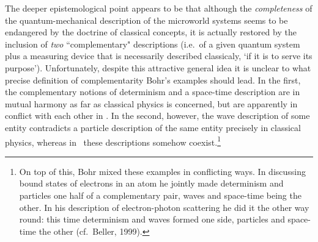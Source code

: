 \documentclass[12pt,titlepage]{article}
\begin{document}
 The deeper epistemological point appears to be that although the {\it completeness} of the quantum-mechanical description of  the microworld systems seems to be endangered by the doctrine of classical concepts, it is actually restored by the inclusion of {\it two} ``complementary" descriptions (i.e.\ of a given quantum system plus a measuring device that is necessarily described classicaly, `if it is to serve its purpose'). Unfortunately, despite this attractive general idea it is unclear to what precise definition of complementarity Bohr's examples should lead. In the first, the complementary notions of determinism and a space-time description are in mutual harmony as far as classical physics is concerned, but are apparently in conflict with each other in \qm. In the second, however, the wave description of some entity contradicts a particle description of the same entity precisely in classical physics, whereas in \qm\ these descriptions somehow coexist.\footnote{On top of this, Bohr mixed these examples in conflicting ways. In discussing bound states of electrons in an atom he jointly made determinism and particles one half of a complementary pair, waves and space-time being the other. In his description of electron-photon scattering he did it the other way round: this time determinism and waves formed one side, particles and space-time the other (cf.\ Beller, 1999).}
\end{document}
